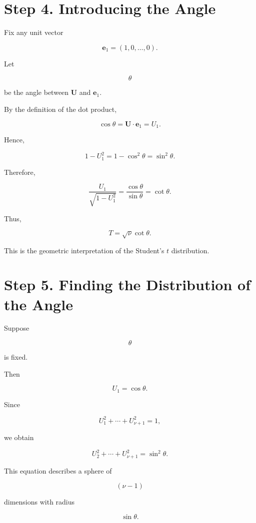 \documentclass[11pt]{article}
\begin{document}
	\section{Step 4. Introducing the Angle}
	
	Fix any unit vector
	
	\[
	\mathbf e_1=(1,0,\ldots,0).
	\]
	
	Let
	
	\[
	\theta
	\]
	
	be the angle between $\mathbf U$ and $\mathbf e_1$.
	
	By the definition of the dot product,
	
	\[
	\cos\theta
	=
	\mathbf U\cdot\mathbf e_1
	=
	U_1.
	\]
	
	Hence,
	
	\[
	1-U_1^2
	=
	1-\cos^2\theta
	=
	\sin^2\theta.
	\]
	
	Therefore,
	
	\[
	\frac{U_1}{\sqrt{1-U_1^2}}
	=
	\frac{\cos\theta}{\sin\theta}
	=
	\cot\theta.
	\]
	
	Thus,
	
	\[
	\boxed{
		T
		=
		\sqrt{\nu}\cot\theta.
	}
	\]
	
	This is the geometric interpretation of the Student's
	$t$ distribution.
	
	
	\section{Step 5. Finding the Distribution of the Angle}
	
	Suppose
	
	\[
	\theta
	\]
	
	is fixed.
	
	Then
	
	\[
	U_1=\cos\theta.
	\]
	
	Since
	
	\[
	U_1^2+\cdots+U_{\nu+1}^2=1,
	\]
	
	we obtain
	
	\[
	U_2^2+\cdots+U_{\nu+1}^2
	=
	\sin^2\theta.
	\]
	
	This equation describes a sphere of
	
	\[
	(\nu-1)
	\]
	
	dimensions with radius
	
	\[
	\sin\theta.
	\]
	
	
\end{document}
